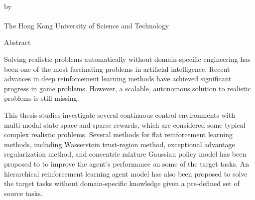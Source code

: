 \begin{center}
{\Large \thesistitle}\\
\vspace{20mm}
by \thesisauthor\\
\vspace{15mm}
\departmentname\\
\vspace{10mm}
The Hong Kong University of Science and Technology
\end{center}
\vspace{8mm}
\begin{center}
Abstract

Solving realistic problems automatically without domain-specific engineering has been one of the most fascinating problems in artificial intelligence. Recent advances in deep reinforcement learning methods have achieved significant progress in game problems. However, a scalable, autonomous solution to realistic problems is still missing.

This thesis studies investigate several continuous control environments with multi-modal state space and sparse rewards, which are considered some typical complex realistic problems. Several methods for flat reinforcement learning methods, including Wasserstein trust-region method, exceptional advantage regularization method, and concentric mixture Gaussian policy model has been proposed to to improve the agent's performance on some of the target tasks. An hierarchical reinforcement learning agent model has also been proposed to solve the target tasks without domain-specific knowledge given a pre-defined set of source tasks. 
\end{center}
\par
\noindent



